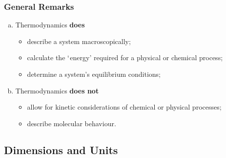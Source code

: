 \documentclass[10pt,compress,handout,ignorenonframetext]{beamer}
\begin{document}
\begin{frame}
 \frametitle{General Remarks}
  \begin{enumerate}[(a)]
   \item <1-> Thermodynamics {\bf does}
     \begin{itemize}
       \item<2-> describe a system macroscopically;
       \item<2-> calculate the $\lq$energy' required for a physical or chemical process;
       \item<2-> determine a system's equilibrium conditions;
     \end{itemize}
   \item<3-> Thermodynamics {\bf does not}
     \begin{itemize}
       \item<4-> allow for kinetic considerations of chemical or physical processes;
       \item<4-> describe molecular behaviour.
     \end{itemize}
  \end{enumerate}
\end{frame}




\subsection{Dimensions and Units}
\end{document}
